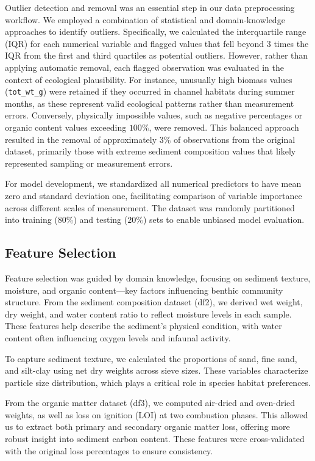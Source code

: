 \documentclass[12pt]{article}
\begin{document}
\qquad Outlier detection and removal was an essential step in our data
preprocessing workflow. We employed a combination of statistical and
domain-knowledge approaches to identify outliers. Specifically, we calculated
the interquartile range (IQR) for each numerical variable and flagged values
that fell beyond 3 times the IQR from the first and third quartiles as potential
outliers. However, rather than applying automatic removal, each flagged
observation was evaluated in the context of ecological plausibility. For
instance, unusually high biomass values (\texttt{tot\_wt\_g}) were retained if
they occurred in channel habitats during summer months, as these represent valid
ecological patterns rather than measurement errors. Conversely, physically
impossible values, such as negative percentages or organic content values
exceeding $100\%$, were removed. This balanced approach resulted in the removal
of approximately $3\%$ of observations from the original dataset, primarily
those with extreme sediment composition values that likely represented sampling
or measurement errors.

\qquad For model development, we standardized all numerical predictors to have
mean zero and standard deviation one, facilitating comparison of variable
importance across different scales of measurement. The dataset was randomly
partitioned into training ($80\%$) and testing ($20\%$) sets to enable unbiased
model evaluation.

\subsection{Feature Selection}

\qquad Feature selection was guided by domain knowledge, focusing on sediment
texture, moisture, and organic content—key factors influencing benthic community
structure. From the sediment composition dataset (df2), we derived wet weight,
dry weight, and water content ratio to reflect moisture levels in each sample.
These features help describe the sediment’s physical condition, with water
content often influencing oxygen levels and infaunal activity.

\qquad To capture sediment texture, we calculated the proportions of sand, fine
sand, and silt-clay using net dry weights across sieve sizes. These variables
characterize particle size distribution, which plays a critical role in species
habitat preferences.

\qquad From the organic matter dataset (df3), we computed air-dried and
oven-dried weights, as well as loss on ignition (LOI) at two combustion phases.
This allowed us to extract both primary and secondary organic matter loss,
offering more robust insight into sediment carbon content. These features were
cross-validated with the original loss percentages to ensure consistency.
\end{document}
